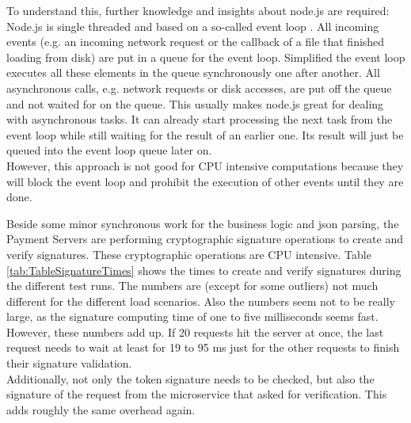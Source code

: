 \documentclass[a4paper,12pt]{scrartcl}
\begin{document}
To understand this, further knowledge and insights about node.js are required: Node.js is single threaded and based on a so-called event loop \cite{web57}. All incoming events (e.g. an incoming network request or the callback of a file that finished loading from disk) are put in a queue for the event loop. Simplified the event loop executes all these elements in the queue synchronously one after another. All asynchronous calls, e.g. network requests or disk accesses, are put off the queue and not waited for on the queue. This usually makes node.js great for dealing with asynchronous tasks. It can already start processing the next task from the event loop while still waiting for the result of an earlier one. Its result will just be queued into the event loop queue later on.\\
However, this approach is not good for CPU intensive computations because they will block the event loop and prohibit the execution of other events until they are done.

Beside some minor synchronous work for the business logic and json parsing, the Payment Servers are performing cryptographic signature operations to create and verify signatures. These cryptographic operations are CPU intensive. Table \ref{tab:TableSignatureTimes} shows the times to create and verify signatures during the different test runs. The numbers are (except for some outliers) not much different for the different load scenarios. Also the numbers seem not to be really large, as the signature computing time of one to five milliseconds seems fast. However, these numbers add up. If 20 requests hit the server at once, the last request needs to wait at least for 19 to 95 ms just for the other requests to finish their signature validation.\\
Additionally, not only the token signature needs to be checked, but also the signature of the request from the microservice that asked for verification. This adds roughly the same overhead again.\\
\end{document}
